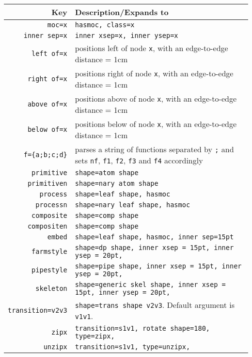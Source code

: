 \begin{longtable} { r|p{11cm} }
  \toprule
  \textbf{Key}  & \textbf{Description/Expands to}  \\
  \midrule
  \texttt{moc=x} & \texttt{hasmoc, class=x} \\
  \texttt{inner sep=x} & \texttt{inner xsep=x, inner ysep=x} \\
  \texttt{left of=x} & positions left of node \texttt{x}, with an edge-to-edge distance = 1cm \\
  \texttt{right of=x} & positions right of node \texttt{x}, with an edge-to-edge distance = 1cm \\
  \texttt{above of=x} & positions above of node \texttt{x}, with an edge-to-edge distance = 1cm \\
  \texttt{below of=x} & positions below of node \texttt{x}, with an edge-to-edge distance = 1cm \\
  \texttt{f=\{a;b;c;d\}} & parses a string of functions separated by \texttt{;} and sets \texttt{nf}, \texttt{f1}, \texttt{f2}, \texttt{f3} and \texttt{f4} accordingly \\
  \texttt{primitive} & \texttt{shape=atom shape} \\
  \texttt{primitiven} & \texttt{shape=nary atom shape} \\
  \texttt{process} & \texttt{shape=leaf shape, hasmoc} \\
  \texttt{processn} & \texttt{shape=nary leaf shape, hasmoc} \\
  \texttt{composite} & \texttt{shape=comp shape} \\
  \texttt{compositen} & \texttt{shape=comp shape} \\
  \texttt{embed} & \texttt{shape=leaf shape, hasmoc, inner sep=15pt} \\
  \texttt{farmstyle} & \texttt{shape=dp shape, inner xsep = 15pt, inner ysep = 20pt,} \\
  \texttt{pipestyle} & \texttt{shape=pipe shape, inner xsep = 15pt, inner ysep = 20pt,} \\
  \texttt{skeleton} & \texttt{shape=generic skel shape, inner xsep = 15pt, inner ysep = 20pt,} \\
  \texttt{transition=v2v3} & \texttt{shape=trans shape v2v3}. Default argument is \texttt{v1v1}. \\
  \texttt{zipx} & \texttt{transition={s1v1}, rotate shape=180, type=zipx,} \\
  \texttt{unzipx} & \texttt{transition={s1v1}, type=unzipx,} \\
  \bottomrule
\end{longtable}


